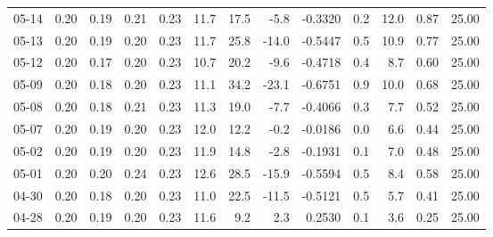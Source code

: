 \begin{threeparttable}
{\begin{tabular}{lrrrrrrrrrrrr}
  05-14 &          0.20 &          0.19 &          0.21 &        0.23 &                11.7 &                17.5 &       -5.8 &      -0.3320 &                 0.2 &             12.0 &            0.87 &                  25.00 \\
  05-13 &          0.20 &          0.19 &          0.20 &        0.23 &                11.7 &                25.8 &      -14.0 &      -0.5447 &                 0.5 &             10.9 &            0.77 &                  25.00 \\
  05-12 &          0.20 &          0.17 &          0.20 &        0.23 &                10.7 &                20.2 &       -9.6 &      -0.4718 &                 0.4 &              8.7 &            0.60 &                  25.00 \\
  05-09 &          0.20 &          0.18 &          0.20 &        0.23 &                11.1 &                34.2 &      -23.1 &      -0.6751 &                 0.9 &             10.0 &            0.68 &                  25.00 \\
  05-08 &          0.20 &          0.18 &          0.21 &        0.23 &                11.3 &                19.0 &       -7.7 &      -0.4066 &                 0.3 &              7.7 &            0.52 &                  25.00 \\
  05-07 &          0.20 &          0.19 &          0.20 &        0.23 &                12.0 &                12.2 &       -0.2 &      -0.0186 &                 0.0 &              6.6 &            0.44 &                  25.00 \\
  05-02 &          0.20 &          0.19 &          0.20 &        0.23 &                11.9 &                14.8 &       -2.8 &      -0.1931 &                 0.1 &              7.0 &            0.48 &                  25.00 \\
  05-01 &          0.20 &          0.20 &          0.24 &        0.23 &                12.6 &                28.5 &      -15.9 &      -0.5594 &                 0.5 &              8.4 &            0.58 &                  25.00 \\
  04-30 &          0.20 &          0.18 &          0.20 &        0.23 &                11.0 &                22.5 &      -11.5 &      -0.5121 &                 0.5 &              5.7 &            0.41 &                  25.00 \\
  04-28 &          0.20 &          0.19 &          0.20 &        0.23 &                11.6 &                 9.2 &        2.3 &       0.2530 &                 0.1 &              3.6 &            0.25 &                  25.00 \\

\end{tabular}}
\end{threeparttable}
